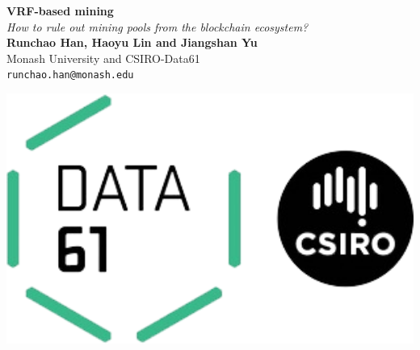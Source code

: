 \documentclass[a0,portrait]{a0poster}
\begin{document}


\begin{minipage}[b]{0.75\linewidth}
    \veryHuge \color{NavyBlue} \textbf{VRF-based mining} \color{Black}\\ %
    \Huge\textit{How to rule out mining pools from the blockchain ecosystem?}\\[2cm] %
    \huge \textbf{Runchao Han, Haoyu Lin and Jiangshan Yu}\\[0.5cm] %
    \huge Monash University and CSIRO-Data61\\[0.4cm] %
    \Large \texttt{runchao.han@monash.edu}\\
\end{minipage}
%
\begin{minipage}[b]{0.25\linewidth}
    \includegraphics[width=20cm]{data61-logo.png}\\
\end{minipage}

\vspace{1cm} %

\end{document}
